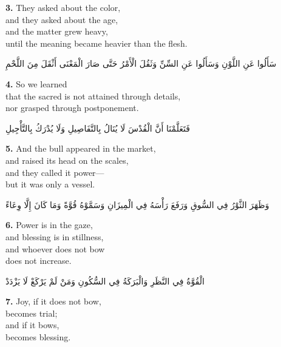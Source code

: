 \documentclass[11pt,a4paper,twoside]{book}
\begin{document}
\vspace{1em}
{\color{indigo}\bfseries 3.}\quad
They asked about the color,\\
and they asked about the age,\\
and the matter grew heavy,\\
until the meaning became heavier than the flesh.

\begin{flushright}
{\arabicfont
سَأَلُوا عَنِ اللَّوْنِ
وَسَأَلُوا عَنِ السِّنِّ
وَثَقُلَ الْأَمْرُ
حَتَّى صَارَ الْمَعْنَى أَثْقَلَ مِنَ اللَّحْمِ}
\end{flushright}

\vspace{1em}
{\color{indigo}\bfseries 4.}\quad
So we learned\\
that the sacred is not attained through details,\\
nor grasped through postponement.

\begin{flushright}
{\arabicfont
فَتَعَلَّمْنَا
أَنَّ الْقُدْسَ لَا يُنَالُ بِالتَّفَاصِيلِ
وَلَا يُدْرَكُ بِالتَّأْجِيلِ}
\end{flushright}

\vspace{1em}
{\color{indigo}\bfseries 5.}\quad
And the bull appeared in the market,\\
and raised its head on the scales,\\
and they called it power---\\
but it was only a vessel.

\begin{flushright}
{\arabicfont
وَظَهَرَ الثَّوْرُ فِي السُّوقِ
وَرَفَعَ رَأْسَهُ فِي الْمِيزَانِ
وَسَمَّوْهُ قُوَّةً
وَمَا كَانَ إِلَّا وِعَاءً}
\end{flushright}

\vspace{1em}
{\color{indigo}\bfseries 6.}\quad
Power is in the gaze,\\
and blessing is in stillness,\\
and whoever does not bow\\
does not increase.

\begin{flushright}
{\arabicfont
الْقُوَّةُ فِي النَّظَرِ
وَالْبَرَكَةُ فِي السُّكُونِ
وَمَنْ لَمْ يَرْكَعْ
لَا يَزْدَدْ}
\end{flushright}

\vspace{1em}
{\color{indigo}\bfseries 7.}\quad
Joy, if it does not bow,\\
becomes trial;\\
and if it bows,\\
becomes blessing.
\end{document}
